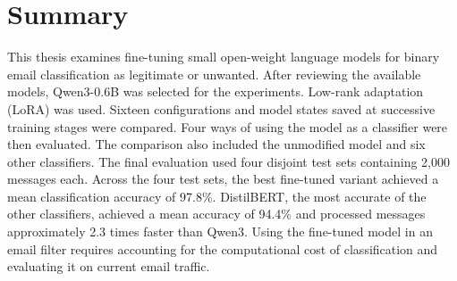 \documentclass[12pt,a4paper]{article}
\begin{document}
\section*{Summary}

This thesis examines fine-tuning small open-weight language models for binary
email classification as legitimate or unwanted. After reviewing the available
models, Qwen3-0.6B was selected for the experiments. Low-rank adaptation
(LoRA) was used. Sixteen configurations and model states
saved at successive training stages were compared. Four ways of using the
model as a classifier were then evaluated. The comparison also included the
unmodified model and six other classifiers. The final evaluation used four
disjoint test sets containing 2,000 messages each. Across the four test sets,
the best fine-tuned variant achieved a mean classification accuracy of 97.8\%.
DistilBERT, the most accurate of the other classifiers, achieved a mean
accuracy of 94.4\% and processed messages approximately 2.3 times faster than
Qwen3.
Using the fine-tuned model in an email filter requires accounting for the
computational cost of classification and evaluating it on current email
traffic.
\end{document}
